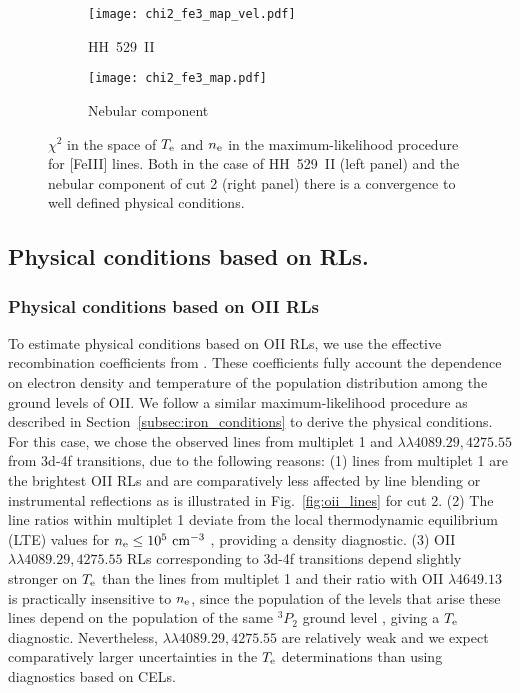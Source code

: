 \documentclass[fleqn,usenatbib]{mnras}
\begin{document}
\begin{figure*}
    \begin{subfigure}{6cm}
    \centering\texttt{[image: chi2\_fe3\_map\_vel.pdf]}
    \caption{HH~529~II}
    \label{fig:fe3_physical_cond_cut2_velyneb_a}
  \end{subfigure}
  \begin{subfigure}{6cm}
    \centering\texttt{[image: chi2\_fe3\_map.pdf]}
    \caption{Nebular component}
    \label{fig:fe3_physical_cond_cut2_velyneb_b}
  \end{subfigure}
 \caption{$\chi^2$ in the space of $T_{\rm e}$ and $n_{\rm e}$ in the maximum-likelihood procedure for [Fe\thinspace III] lines. Both in the case of HH~529~II (left panel) and the nebular component of cut 2 (right panel) there is a convergence to well defined physical conditions.}
\label{fig:fe3_physical_cond_cut2_velyneb}

\end{figure*}



\subsection{Physical conditions based on RLs.}
\label{subsec:physical_conditions_rls}


\subsubsection{Physical conditions based on \mbox{O}\thinspace \mbox{II} RLs}
\label{subsubsec:oii_pc}

To estimate physical conditions based on O\thinspace II RLs, we use the effective recombination coefficients from \citet{Storey17}. These coefficients fully account the dependence on electron density and temperature of the population distribution among the ground levels of O\thinspace II. We follow a similar maximum-likelihood procedure as described in Section~\ref{subsec:iron_conditions} to derive the  physical conditions. For this case, we chose the observed lines from multiplet 1 and $\lambda \lambda 4089.29, 4275.55$ from 3d-4f transitions, due to the following reasons: (1) lines from multiplet 1 are the brightest O\thinspace II RLs and are comparatively less affected by line blending or instrumental reflections as is illustrated in Fig.~\ref{fig:oii_lines} for cut 2. (2) The line ratios within multiplet 1 deviate from the local thermodynamic equilibrium (LTE) values for $n_{\rm e}\leq 10^5 \text{ cm}^{-3}$ \citep{Storey17}, providing a density diagnostic. (3) O\thinspace II $\lambda \lambda 4089.29, 4275.55 $ RLs corresponding to 3d-4f transitions depend slightly stronger on $T_{\rm e}$ than the lines from multiplet 1 and their ratio with O\thinspace II $\lambda 4649.13$ is practically insensitive to $n_{\rm e}$, since the population of the levels that arise these lines depend on the population of the same $^{3}P_2$ ground level \citep{Storey17}, giving a $T_{\rm e}$ diagnostic. Nevertheless, $\lambda \lambda 4089.29, 4275.55 $ are relatively weak and we expect comparatively larger uncertainties in the $T_{\rm e}$ determinations than using diagnostics based on CELs. 
\end{document}
